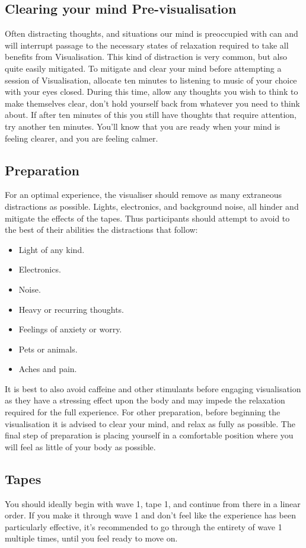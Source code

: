 \documentclass{article}
\begin{document}
\subsection{Clearing your mind Pre-visualisation}
Often distracting thoughts, and situations our mind is preoccupied with can and will interrupt passage to the   necessary states of relaxation required to take all benefits from Visualisation.
This kind of distraction is very common, but also quite easily mitigated. To mitigate and clear your mind before  attempting a session of Visualisation, allocate ten minutes to listening to music of your
choice with your eyes closed. During this time, allow any thoughts you wish to think to make themselves clear, don't hold yourself back from whatever you need to think about. If after ten minutes of
this you still have thoughts that require attention, try another ten minutes. You'll know that you are ready when your mind is feeling clearer, and you are feeling calmer.


\subsection{Preparation}
For an optimal experience, the visualiser should remove as many extraneous distractions as possible. Lights, electronics, and background noise, all hinder and mitigate the effects of the tapes. Thus participants should attempt to avoid to the best of their abilities the distractions that follow:
\begin{itemize}
  \item Light of any kind.
  \item Electronics.
  \item Noise.
  \item Heavy or recurring thoughts.
  \item Feelings of anxiety or worry.
  \item Pets or animals.
  \item Aches and pain.
\end{itemize}
It is best to also avoid caffeine and other stimulants before engaging visualisation as they have a stressing effect upon the body and may impede the relaxation required for the full experience.
For other preparation, before beginning the visualisation it is advised to clear your mind, and relax as fully as possible.
The final step of preparation is placing yourself in a comfortable position where you will feel as little of your body as possible.

\subsection{Tapes}
You should ideally begin with wave 1, tape 1, and continue from there in a linear order. If you make it through wave 1 and don't feel like the experience has been particularly effective, it's
recommended to go through the entirety of wave 1 multiple times, until you feel ready to move on.
\end{document}
